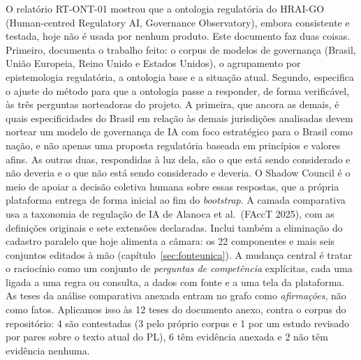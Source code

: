 \documentclass[12pt,a4paper,oneside,english,brazil]{abntex2}
\begin{document}

\pretextual
\imprimirfolhaderostorelatorio

\begin{resumorelatorio}
O relatório RT-ONT-01 mostrou que a ontologia regulatória do HRAI-GO (Human-centred Regulatory AI, Governance Observatory), embora consistente e testada, hoje não é usada por nenhum produto. Este documento faz duas coisas. Primeiro, documenta o trabalho feito: o corpus de modelos de governança (Brasil, União Europeia, Reino Unido e Estados Unidos), o agrupamento por epistemologia regulatória, a ontologia base e a situação atual. Segundo, especifica o ajuste do método para que a ontologia passe a responder, de forma verificável, às três perguntas norteadoras do projeto. A primeira, que ancora as demais, é quais especificidades do Brasil em relação às demais jurisdições analisadas devem nortear um modelo de governança de IA com foco estratégico para o Brasil como nação, e não apenas uma proposta regulatória baseada em princípios e valores afins. As outras duas, respondidas à luz dela, são o que está sendo considerado e não deveria e o que não está sendo considerado e deveria. O Shadow Council é o meio de apoiar a decisão coletiva humana sobre essas respostas, que a própria plataforma entrega de forma inicial ao fim do \emph{bootstrap}. A camada comparativa usa a taxonomia de regulação de IA de Alanoca et al.\ (FAccT 2025), com as definições originais e sete extensões declaradas. Inclui também a eliminação do cadastro paralelo que hoje alimenta a câmara: os 22 componentes e mais seis conjuntos editados à mão (capítulo~\ref{sec:fonteunica}). A mudança central é tratar o raciocínio como um conjunto de \emph{perguntas de competência} explícitas, cada uma ligada a uma regra ou consulta, a dados com fonte e a uma tela da plataforma. As teses da análise comparativa anexada entram no grafo como \emph{afirmações}, não como fatos. Aplicamos isso às 12 teses do documento anexo, contra o corpus do repositório: 4 são contestadas (3 pelo próprio corpus e 1 por um estudo revisado por pares sobre o texto atual do PL), 6 têm evidência anexada e 2 não têm evidência nenhuma.
\end{resumorelatorio}

\listoftables*
\cleardoublepage
\end{document}

